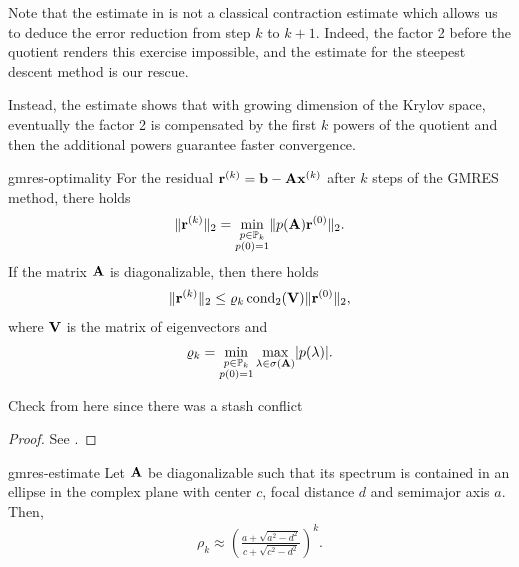 \begin{remark}
  Note that the estimate in 
  is not a classical contraction estimate which allows us to deduce
  the error reduction from step $k$ to $k+1$. Indeed, the factor 2
  before the quotient renders this exercise impossible, and the
  estimate for the steepest descent method is our rescue.

  Instead, the estimate shows that with growing dimension of the
  Krylov space, eventually the factor 2 is compensated by the first
  $k$ powers of the quotient and then the additional powers guarantee
  faster convergence.
\end{remark}


\begin{Theorem}{gmres-optimality}
  For the residual $\mathbf r^{(k)} = \mathbf b-\mathbf A\mathbf x^{(k)}$ after $k$ steps of
  the GMRES method, there holds
  \begin{gather}
    \lVert\mathbf r^{(k)}\rVert_2 = \min_{\substack{p\in\mathbb P_k\\p(0) = 1}}
    \lVert p(\mathbf A)\mathbf r^{(0)}\rVert_2.
  \end{gather}
  If the matrix $\mathbf A$ is diagonalizable, then there holds
    \begin{gather}
    \lVert\mathbf r^{(k)}\rVert_2 \le \varrho_k \operatorname{cond}_2(\mathbf V) \lVert\mathbf r^{(0)}\rVert_2,
  \end{gather}
  where $\mathbf V$ is the matrix of eigenvectors and
  \begin{gather}
    \varrho_k = \min_{\substack{p\in\mathbb P_k\\p(0) = 1}} \max_{\lambda\in\sigma(\mathbf A)} \lvert p(\lambda)\rvert.
  \end{gather}
\end{Theorem}

\begin{todo}
  Check from here since there was a stash conflict
\end{todo}

\begin{proof}
  See \cite[Proposition 6.32]{Saad00}.
\end{proof}

\begin{Corollary}{gmres-estimate}
  Let $\mathbf A$ be diagonalizable such that its spectrum is contained in
  an ellipse in the complex plane with center $c$, focal distance $d$
  and semimajor axis $a$. Then,
  \begin{gather}
     \rho_k \approx \left(
      \frac{a+\sqrt{a^2-d^2}}{c+\sqrt{c^2-d^2}}
      \right)^k.
  \end{gather}
\end{Corollary}

